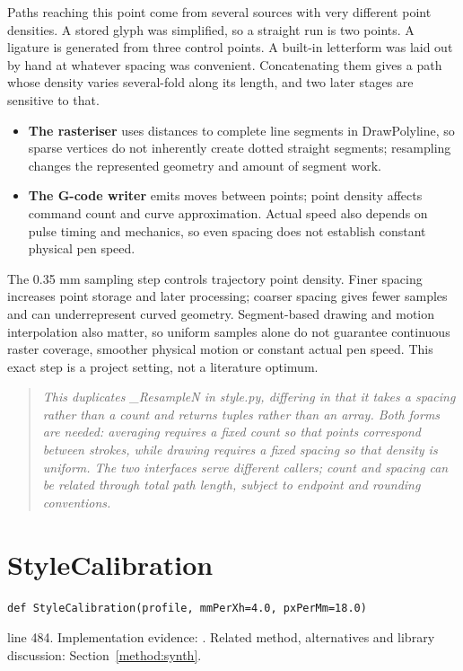 Paths reaching this point come from several sources with very different point densities. A stored glyph was simplified, so a straight run is two points. A ligature is generated from three control points. A built-in letterform was laid out by hand at whatever spacing was convenient. Concatenating them gives a path whose density varies several-fold along its length, and two later stages are sensitive to that.


\begin{itemize}\setlength\itemsep{0pt}
  \item \textbf{The rasteriser} uses distances to complete line segments in DrawPolyline, so sparse vertices do not inherently create dotted straight segments; resampling changes the represented geometry and amount of segment work.
  \item \textbf{The G-code writer} emits moves between points; point density affects command count and curve approximation. Actual speed also depends on pulse timing and mechanics, so even spacing does not establish constant physical pen speed.
\end{itemize}

The 0.35 mm sampling step controls trajectory point density. Finer spacing increases point storage and later processing; coarser spacing gives fewer samples and can underrepresent curved geometry. Segment-based drawing and motion interpolation also matter, so uniform samples alone do not guarantee continuous raster coverage, smoother physical motion or constant actual pen speed. This exact step is a project setting, not a literature optimum.


\begin{quote}\small\itshape This duplicates \_ResampleN in style.py, differing in that it takes a spacing rather than a count and returns tuples rather than an array. Both forms are needed: averaging requires a fixed count so that points correspond between strokes, while drawing requires a fixed spacing so that density is uniform. The two interfaces serve different callers; count and spacing can be related through total path length, subject to endpoint and rounding conventions.\end{quote}


\section{StyleCalibration}\label{fn:synthesise:StyleCalibration}
\begin{lstlisting}[style=sig]
def StyleCalibration(profile, mmPerXh=4.0, pxPerMm=18.0)
\end{lstlisting}
 line 484. Implementation evidence: \cite{code2026}. Related method, alternatives and library discussion: Section~\ref{method:synth}.


